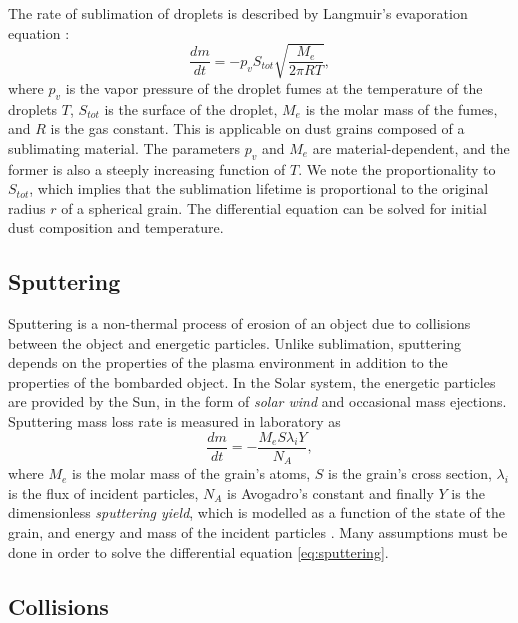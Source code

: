 The rate of sublimation of droplets is described by Langmuir's evaporation equation \citep{langmuir1918evaporation}:
\begin{equation}
    \frac{dm}{dt} = -p_{v} S_{tot} \sqrt{\frac{M_e}{2\pi RT}},
\end{equation}
where $p_v$ is the vapor pressure of the droplet fumes at the temperature of the droplets $T$, $S_{tot}$ is the surface of the droplet, $M_e$ is the molar mass of the fumes, and $R$ is the gas constant. This is applicable on dust grains composed of a sublimating material. The parameters $p_v$ and $M_e$ are material-dependent, and the former is also a steeply increasing function of $T$. We note the proportionality to $S_{tot}$, which implies that the sublimation lifetime is proportional to the original radius $r$ of a spherical grain. The differential equation can be solved for initial dust composition and temperature.   

\subsection{Sputtering}

Sputtering is a non-thermal process of erosion of an object due to collisions between the object and energetic particles. Unlike sublimation, sputtering depends on the properties of the plasma environment in addition to the properties of the bombarded object. In the Solar system, the energetic particles are provided by the Sun, in the form of \textit{solar wind} and occasional mass ejections. Sputtering mass loss rate is measured in laboratory as
\begin{equation}
    \frac{dm}{dt} = - \frac{ M_e S \lambda_i Y }{N_A}, 
    \label{eq:sputtering}
\end{equation}
where $M_e$ is the molar mass of the grain's atoms, $S$ is the grain's cross section, $\lambda_i$ is the flux of incident particles, $N_A$ is Avogadro's constant and finally $Y$ is the dimensionless \textit{sputtering yield}, which is modelled as a function of the state of the grain, and energy and mass of the incident particles \citep{vyvsinka2018odpravsovani}. Many assumptions must be done in order to solve the differential equation \ref{eq:sputtering}. 

\subsection{Collisions} \label{ch:collisions}

